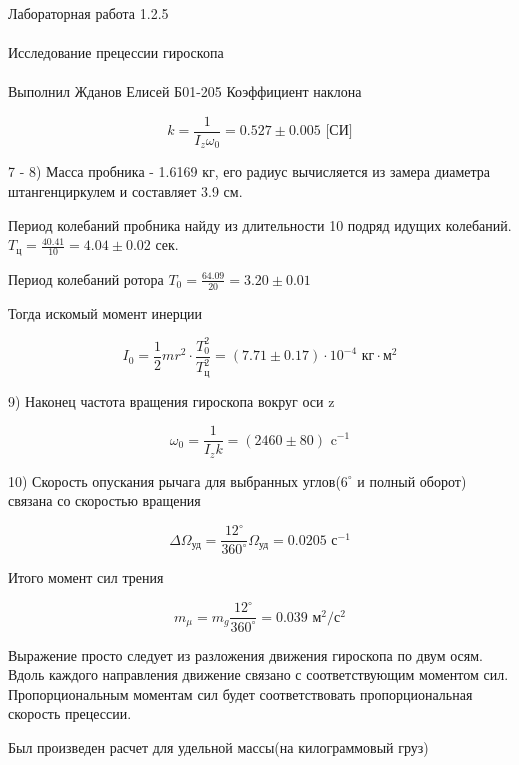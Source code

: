 \documentclass{astroedu-lab}
\begin{document}
\begin{problem}{\huge Лабораторная работа 1.2.5\\\\Исследование прецессии гироскопа\\\\Выполнил Жданов Елисей Б01-205}
Коэффициент наклона

\begin{equation}
	k = \frac{1}{I_z \omega_0} = 0.527 \pm 0.005 \text{ [СИ]}
\end{equation}

7 - 8) Масса пробника - 1.6169 кг, его радиус вычисляется из замера диаметра штангенциркулем и составляет 3.9 см.

Период колебаний пробника найду из длительности 10 подряд идущих колебаний. $T_\text{ц} = \frac{40.41}{10} = 4.04 \pm 0.02$ сек.

Период колебаний ротора $T_\text{0} = \frac{64.09}{20} = 3.20 \pm 0.01$

Тогда искомый момент инерции

\begin{equation}
	I_0 = \frac{1}{2} m r^2 \cdot \frac{T_0^2}{T_\text{ц}^2} = (7.71 \pm 0.17) \cdot 10^{-4} \text{ кг} \cdot \text{м}^2
\end{equation}

9) Наконец частота вращения гироскопа вокруг оси z

\begin{equation}
	\boxed{\omega_0 = \frac{1}{I_z k} = (2460 \pm 80) \text{ c}^{-1}}
\end{equation}

10) Скорость опускания рычага для выбранных углов($6^\circ$ и полный оборот) связана со скоростью вращения

\begin{equation}
	\Delta \Omega_{\text{уд}} = \frac{12^\circ}{360^\circ} \Omega_{\text{уд}} = 0.0205 \text{ с}^{-1}
\end{equation}

Итого момент сил трения

\begin{equation}
	\boxed{m_{\mu} = m_{g} \frac{12^\circ}{360^\circ} = 0.039 \text{ м}^2 / \text{с}^2}
\end{equation}

Выражение просто следует из разложения движения гироскопа по двум осям. Вдоль каждого направления движение связано с соответствующим моментом сил. Пропорциональным моментам сил будет соответствовать пропорциональная скорость прецессии.

Был произведен расчет для удельной массы(на килограммовый груз)


\end{problem}
\end{document}
